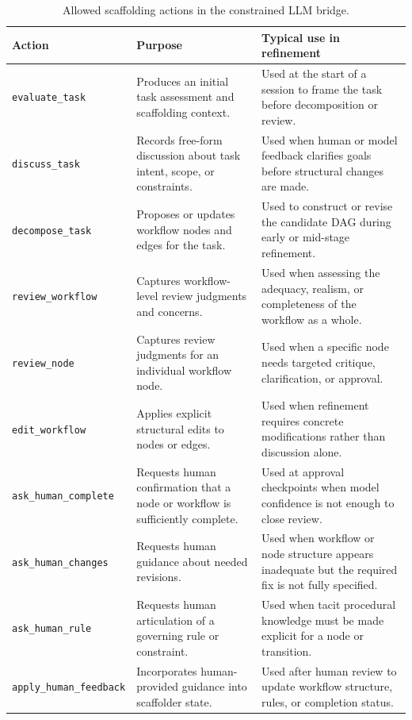 \begin{table}[htbp]
\centering
\caption{Allowed scaffolding actions in the constrained LLM bridge.}
\begin{tabular}{p{3.2cm} p{4.6cm} p{6.0cm}}
\hline
\textbf{Action} & \textbf{Purpose} & \textbf{Typical use in refinement} \\
\hline
\texttt{evaluate\_task} & Produces an initial task assessment and scaffolding context. & Used at the start of a session to frame the task before decomposition or review. \\
\texttt{discuss\_task} & Records free-form discussion about task intent, scope, or constraints. & Used when human or model feedback clarifies goals before structural changes are made. \\
\texttt{decompose\_task} & Proposes or updates workflow nodes and edges for the task. & Used to construct or revise the candidate DAG during early or mid-stage refinement. \\
\texttt{review\_workflow} & Captures workflow-level review judgments and concerns. & Used when assessing the adequacy, realism, or completeness of the workflow as a whole. \\
\texttt{review\_node} & Captures review judgments for an individual workflow node. & Used when a specific node needs targeted critique, clarification, or approval. \\
\texttt{edit\_workflow} & Applies explicit structural edits to nodes or edges. & Used when refinement requires concrete modifications rather than discussion alone. \\
\texttt{ask\_human\_complete} & Requests human confirmation that a node or workflow is sufficiently complete. & Used at approval checkpoints when model confidence is not enough to close review. \\
\texttt{ask\_human\_changes} & Requests human guidance about needed revisions. & Used when workflow or node structure appears inadequate but the required fix is not fully specified. \\
\texttt{ask\_human\_rule} & Requests human articulation of a governing rule or constraint. & Used when tacit procedural knowledge must be made explicit for a node or transition. \\
\texttt{apply\_human\_feedback} & Incorporates human-provided guidance into scaffolder state. & Used after human review to update workflow structure, rules, or completion status. \\
\hline
\end{tabular}
\end{table}

